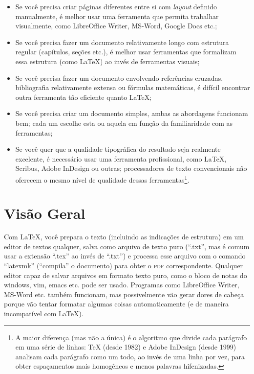 \begin{itemize}
\item Se você precisa criar páginas diferentes entre si com \emph{layout}
definido manualmente, é melhor usar uma ferramenta que permita trabalhar
visualmente, como LibreOffice Writer, MS-Word, Google Docs etc.;

\item Se você precisa fazer um documento relativamente longo com estrutura
regular (capítulos, seções etc.), é melhor usar ferramentas que formalizam
essa estrutura (como \LaTeX{}) ao invés de ferramentas visuais;

\item Se você precisa fazer um documento envolvendo referências cruzadas,
bibliografia relativamente extensa ou fórmulas matemáticas, é difícil
encontrar outra ferramenta tão eficiente quanto \LaTeX{};

\item Se você precisa criar um documento simples, ambas as abordagens
funcionam bem; cada um escolhe esta ou aquela em função da familiaridade
com as ferramentas;

\item Se você quer que a qualidade tipográfica do resultado seja realmente
excelente, é necessário usar uma ferramenta profissional, como \LaTeX{},
Scribus, Adobe InDesign ou outras; processadores de texto convencionais não
oferecem o mesmo nível de qualidade dessas ferramentas\footnote{A maior
diferença (mas não a única) é o algoritmo que divide cada parágrafo em uma
série de linhas: \TeX{} (desde 1982) e Adobe InDesign (desde 1999) analisam
cada parágrafo como um todo, ao invés de uma linha por vez, para obter
espaçamentos mais homogêneos e menos palavras hifenizadas.}.
\end{itemize}

\section{Visão Geral}

Com \LaTeX{}, você prepara o texto (incluindo as indicações de estrutura) em
um editor de textos qualquer, salva como arquivo de texto puro (``.txt'',
mas é comum usar a extensão ``.tex'' ao invés de ``.txt'') e processa esse
arquivo com o comando ``latexmk'' (``compila'' o documento) para obter o
\textsc{pdf} correspondente. Qualquer editor capaz de salvar arquivos em formato
texto puro, como o bloco de notas do windows, vim, emacs etc. pode ser usado.
Programas como LibreOffice Writer, MS-Word etc. também funcionam, mas
possivelmente vão gerar dores de cabeça porque vão tentar formatar algumas
coisas automaticamente (e de maneira incompatível com \LaTeX{}).

